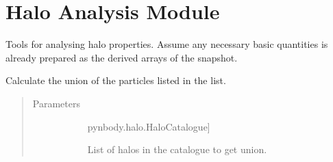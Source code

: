 \documentclass[letterpaper,10pt,english]{sphinxmanual}
\begin{document}
\section{Halo Analysis Module}
\label{\detokenize{halo_analysis:module-modules.halo_analysis}}\label{\detokenize{halo_analysis:halo-analysis-module}}\label{\detokenize{halo_analysis::doc}}
Tools for analysing halo properties. 
Assume any necessary basic quantities is already 
prepared as the derived arrays of the snapshot.

\begin{fulllineitems}
\label{\detokenize{halo_analysis:modules.halo_analysis.get_union}}
Calculate the union of the particles listed in the list.
\begin{quote}\begin{description}
\item[{Parameters}] \leavevmode\begin{description}
\item[{}] \leavevmode{[}pynbody.halo.HaloCatalogue{]}
\item[{}] \leavevmode
List of halos in the catalogue to get union.

\end{description}

\end{description}\end{quote}

\end{fulllineitems}

\end{document}
